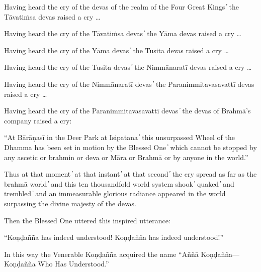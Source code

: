 Having heard the cry of the devas of the realm of the Four Great Kings  ̓  the Tāvatiṁsa devas raised a cry …

Having heard the cry of the Tāvatiṁsa devas  ̓  the Yāma devas raised a cry …

Having heard the cry of the Yāma devas  ̓  the Tusita devas raised a cry …

Having heard the cry of the Tusita devas  ̓  the Nimmānaratī devas raised a cry …

Having heard the cry of the Nimmānaratī devas  ̓  the Paranimmitavasavattī devas raised a cry …

Having heard the cry of the Paranimmitavasavattī devas  ̓  the devas of Brahmā’s company raised a cry:

“At Bārāṇasī in the Deer Park at Isipatana  ̓  this unsurpassed Wheel of the Dhamma has been set in motion by the Blessed One  ̓  which cannot be stopped by any ascetic or brahmin or deva or Māra or Brahmā or by anyone in the world.”

Thus at that moment  ̓  at that instant  ̓  at that second  ̓  the cry spread as far as the brahmā world  ̓  and this ten thousandfold world system shook  ̓  quaked  ̓  and trembled  ̓  and an immeasurable glorious radiance appeared in the world surpassing the divine majesty of the devas.

Then the Blessed One uttered this inspired utterance:

“Koṇḍañña has indeed understood! Koṇḍañña has indeed understood!”

In this way the Venerable Koṇḍañña acquired the name “Aññā Koṇḍañña—Koṇḍañña Who Has Understood.”

\suttaRef{[SN 56.11]}
